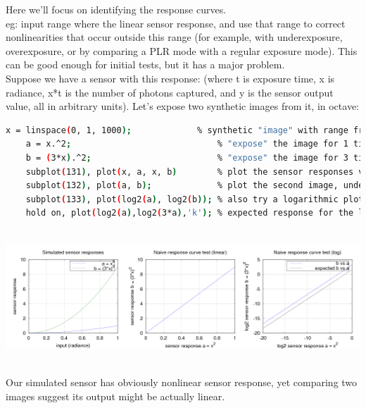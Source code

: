 {Here we'll focus on identifying the response curves.\\

eg: input range where the linear sensor response, and use that range to correct nonlinearities that occur outside this range (for example, with underexposure, overexposure, or by comparing a PLR mode with a regular exposure mode). This can be good enough for initial tests, but it has a major problem. \\

Suppose we have a sensor with this response: (where t is exposure time, x is radiance, x*t is the number of photons captured, and y is the sensor output value, all in arbitrary units). Let's expose two synthetic images from it, in octave: 

\begin{lstlisting}[language=bash,morekeywords=$,keywordstyle=\bfseries,frame=none,xleftmargin=.25in,belowskip=2em, aboveskip=2em]
    x = linspace(0, 1, 1000);             % synthetic "image" with range from 0 to 1 (black to white)
    a = x.^2;                             % "expose" the image for 1 time unit
    b = (3*x).^2;                         % "expose" the image for 3 time units
    subplot(131), plot(x, a, x, b)        % plot the sensor responses vs input signal (radiance)
    subplot(132), plot(a, b);             % plot the second image, under the assumption that first one might be linear
    subplot(133), plot(log2(a), log2(b)); % also try a logarithmic plot
    hold on, plot(log2(a),log2(3*a),'k'); % expected response for the logarithmic plot
\end{lstlisting}

\begin{center}
\includegraphics[height=5cm]{images/naive}
\end{center}

Our simulated sensor has obviously nonlinear sensor response, yet comparing two images suggest its output might be actually linear.\\

}
